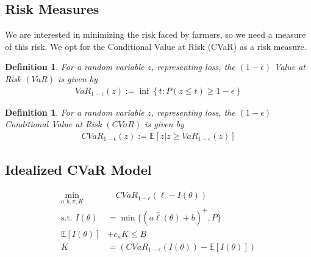 \documentclass[11pt]{article}
\newtheorem{defn}[lemma]{Definition}
\begin{document}
  \subsection{Risk Measures}
    We are interested in minimizing the risk faced by farmers, so we need a measure of this risk. We opt for the Conditional Value at Risk (CVaR) as a risk measure.

    \begin{defn}
        For a random variable $z$, representing loss, the $(1-\epsilon)$ Value at Risk $(VaR)$ is given by 
        \begin{align*}
            VaR_{1-\epsilon}(z) := \inf \left \{ t : P(z \leq t) \geq 1-\epsilon \right \}
        \end{align*}
        \end{defn}
    
        \begin{defn}
        For a random variable $z$, representing loss, the $(1-\epsilon)$ Conditional Value at Risk $(CVaR)$ is given by 
        \begin{align*}
            CVaR_{1-\epsilon}(z) := \mathbb{E}\left [z | z \geq VaR_{1-\epsilon}(z) \right ]
        \end{align*}
        \end{defn}
    
  \subsection{Idealized CVaR Model}
    \begin{align}
        \min_{a,b,\pi, K}  & \quad CVaR_{1-\epsilon}\left ( \ell - I(\theta) \right)\\
        \text{s.t.   }I(\theta) &= \min \{ (a\hat{\ell}(\theta) + b)^+,P \} \\
        \mathbb{E}\left [ I(\theta) \right ] &+ c_{\kappa} K \leq B \\
        K &= \left( CVaR_{1-\epsilon}\left ( I(\theta) \right ) - \mathbb{E}[I(\theta)] \right) \label{cons-budget}
    \end{align}
\end{document}
